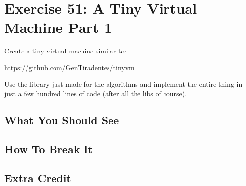 \chapter{Exercise 51: A Tiny Virtual Machine Part 1}

Create a tiny virtual machine similar to:

https://github.com/GenTiradentes/tinyvm

Use the library just made for the algorithms and implement the entire thing in just a few
hundred lines of code (after all the libs of course).


\section{What You Should See}


\section{How To Break It}


\section{Extra Credit}



